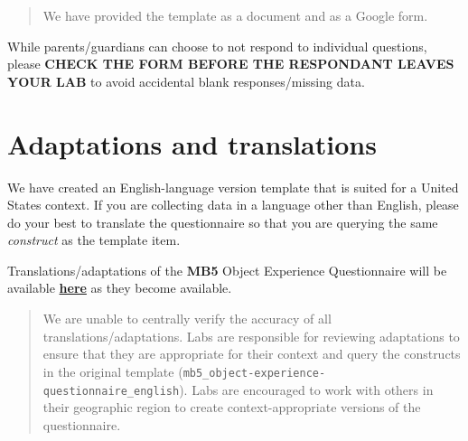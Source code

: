 \documentclass[
  letterpaper,
  DIV=11,
  numbers=noendperiod,
  oneside]{scrreprt}
\begin{document}
\begin{quote}
We have provided the template as a document and as a Google form.
\end{quote}

\begin{tcolorbox}[enhanced jigsaw, coltitle=black, colframe=quarto-callout-warning-color-frame, titlerule=0mm, colback=white, arc=.35mm, toprule=.15mm, left=2mm, colbacktitle=quarto-callout-warning-color!10!white, opacityback=0, bottomtitle=1mm, title=\textcolor{quarto-callout-warning-color}{\faExclamationTriangle}\hspace{0.5em}{CHECK FOR MISSING DATA}, breakable, rightrule=.15mm, opacitybacktitle=0.6, toptitle=1mm, leftrule=.75mm, bottomrule=.15mm]

While parents/guardians can choose to not respond to individual
questions, please \textbf{CHECK THE FORM BEFORE THE RESPONDANT LEAVES
YOUR LAB} to avoid accidental blank responses/missing
data.\footnotemark{}

\end{tcolorbox}


\section{Adaptations and
translations}\label{adaptations-and-translations-1}

We have created an English-language version template that is suited for
a United States context. If you are collecting data in a language other
than English, please do your best to translate the questionnaire so that
you are querying the same \emph{construct} as the template item.

\begin{tcolorbox}[enhanced jigsaw, coltitle=black, colframe=quarto-callout-note-color-frame, titlerule=0mm, colback=white, arc=.35mm, toprule=.15mm, left=2mm, colbacktitle=quarto-callout-note-color!10!white, opacityback=0, bottomtitle=1mm, title=\textcolor{quarto-callout-note-color}{\faInfo}\hspace{0.5em}{MB5 Object Experience directory}, breakable, rightrule=.15mm, opacitybacktitle=0.6, toptitle=1mm, leftrule=.75mm, bottomrule=.15mm]

Translations/adaptations of the \textbf{MB5} Object Experience
Questionnaire will be available
\href{https://drive.google.com/drive/folders/1Xd0kmVywB66GUYyePFYJ2W2ouBcnW6u3?usp=drive_link}{\textbf{here}}
as they become available.

\begin{quote}
We are unable to centrally verify the accuracy of all
translations/adaptations. Labs are responsible for reviewing adaptations
to ensure that they are appropriate for their context and query the
constructs in the original template
(\texttt{mb5\_object-experience-questionnaire\_english}). Labs are
encouraged to work with others in their geographic region to create
context-appropriate versions of the questionnaire.
\end{quote}

\end{tcolorbox}
\end{document}
